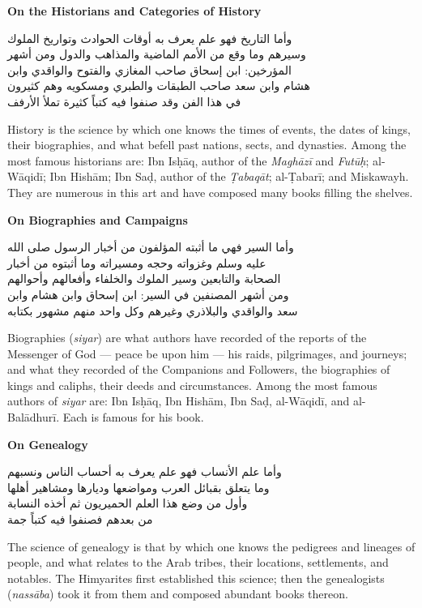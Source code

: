 \documentclass[11pt,a4paper]{article}
\newcommand{\ar}[1]{{\arabicfont\beginR #1\endR}}
\newcommand{\bilingual}[2]{%
  \noindent
  \begin{minipage}[t]{0.47\textwidth}
    \vspace{0pt}
    \begin{flushright}
    {\arabicfont\beginR #1\endR}
    \end{flushright}
  \end{minipage}%
  \hfill\vline\hfill
  \begin{minipage}[t]{0.47\textwidth}
    \vspace{0pt}
    #2
  \end{minipage}%
  \par\vspace{0.8em}
}
\newcommand{\bilingualsubsection}[2]{%
  \vspace{0.6em}%
  \noindent
  \begin{minipage}[t]{0.47\textwidth}
    \begin{flushright}
    \textbf{\color{sectioncolor}\ar{#1}}
    \end{flushright}
  \end{minipage}%
  \hfill
  \begin{minipage}[t]{0.47\textwidth}
    \textbf{\color{sectioncolor}#2}
  \end{minipage}%
  \par\vspace{0.4em}%
}
\begin{document}
\bilingualsubsection{في المؤرخين وأصناف التاريخ}{On the Historians and Categories of History}

\bilingual
{وأما التاريخ فهو علم يعرف به أوقات الحوادث وتواريخ الملوك\\
وسيرهم وما وقع من الأمم الماضية والمذاهب والدول ومن أشهر\\
المؤرخين: ابن إسحاق صاحب المغازي والفتوح والواقدي وابن\\
هشام وابن سعد صاحب الطبقات والطبري ومسكويه وهم كثيرون\\
في هذا الفن وقد صنفوا فيه كتباً كثيرة تملأ الأرفف}
{History is the science by which one knows the times of events, the dates
of kings, their biographies, and what befell past nations, sects, and
dynasties. Among the most famous historians are: Ibn Is\d{h}\=aq, author
of the \textit{Magh\=az\=i} and \textit{Fut\=u\d{h}}; al-W\=aqid\=i; Ibn
Hish\=am; Ibn Sa\d{d}, author of the \textit{\d{T}abaq\=at}; al-\d{T}abar\=i;
and Miskawayh. They are numerous in this art and have composed many
books filling the shelves.}

\bilingualsubsection{في السير والمغازي}{On Biographies and Campaigns}

\bilingual
{وأما السير فهي ما أثبته المؤلفون من أخبار الرسول صلى الله\\
عليه وسلم وغزواته وحجه ومسيراته وما أثبتوه من أخبار\\
الصحابة والتابعين وسير الملوك والخلفاء وأفعالهم وأحوالهم\\
ومن أشهر المصنفين في السير: ابن إسحاق وابن هشام وابن\\
سعد والواقدي والبلاذري وغيرهم وكل واحد منهم مشهور بكتابه}
{Biographies (\textit{siyar}) are what authors have recorded of the reports
of the Messenger of God — peace be upon him — his raids, pilgrimages,
and journeys; and what they recorded of the Companions and Followers, the
biographies of kings and caliphs, their deeds and circumstances. Among
the most famous authors of \textit{siyar} are: Ibn Is\d{h}\=aq, Ibn
Hish\=am, Ibn Sa\d{d}, al-W\=aqid\=i, and al-Bal\=adhur\=i. Each is
famous for his book.}

\bilingualsubsection{في الأنساب}{On Genealogy}

\bilingual
{وأما علم الأنساب فهو علم يعرف به أحساب الناس ونسبهم\\
وما يتعلق بقبائل العرب ومواضعها وديارها ومشاهير أهلها\\
وأول من وضع هذا العلم الحميريون ثم أخذه النسابة\\
من بعدهم فصنفوا فيه كتباً جمة}
{The science of genealogy is that by which one knows the pedigrees and
lineages of people, and what relates to the Arab tribes, their locations,
settlements, and notables. The Himyarites first established this science;
then the genealogists (\textit{nass\=aba}) took it from them and composed
abundant books thereon.}
\end{document}
